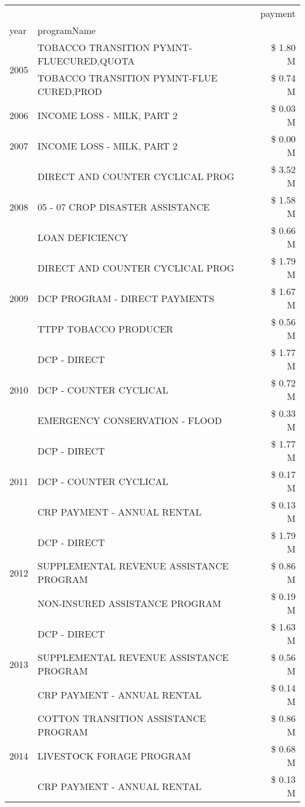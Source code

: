 \begin{tabular}{llr}
\toprule
 &  & payment \\
year & programName &  \\
\midrule
\multirow[t]{2}{*}{2005} & TOBACCO TRANSITION PYMNT-FLUECURED,QUOTA & \$ 1.80 M \\
 & TOBACCO TRANSITION PYMNT-FLUE CURED,PROD & \$ 0.74 M \\
\cline{1-3}
2006 & INCOME LOSS - MILK, PART 2 & \$ 0.03 M \\
\cline{1-3}
2007 & INCOME LOSS - MILK, PART 2 & \$ 0.00 M \\
\cline{1-3}
\multirow[t]{3}{*}{2008} & DIRECT AND COUNTER CYCLICAL PROG & \$ 3.52 M \\
 & 05 - 07 CROP DISASTER ASSISTANCE & \$ 1.58 M \\
 & LOAN DEFICIENCY & \$ 0.66 M \\
\cline{1-3}
\multirow[t]{3}{*}{2009} & DIRECT AND COUNTER CYCLICAL PROG & \$ 1.79 M \\
 & DCP PROGRAM - DIRECT PAYMENTS & \$ 1.67 M \\
 & TTPP TOBACCO PRODUCER & \$ 0.56 M \\
\cline{1-3}
\multirow[t]{3}{*}{2010} & DCP - DIRECT & \$ 1.77 M \\
 & DCP - COUNTER CYCLICAL & \$ 0.72 M \\
 & EMERGENCY CONSERVATION - FLOOD & \$ 0.33 M \\
\cline{1-3}
\multirow[t]{3}{*}{2011} & DCP - DIRECT & \$ 1.77 M \\
 & DCP - COUNTER CYCLICAL & \$ 0.17 M \\
 & CRP PAYMENT - ANNUAL RENTAL & \$ 0.13 M \\
\cline{1-3}
\multirow[t]{3}{*}{2012} & DCP - DIRECT & \$ 1.79 M \\
 & SUPPLEMENTAL REVENUE ASSISTANCE PROGRAM & \$ 0.86 M \\
 & NON-INSURED ASSISTANCE PROGRAM & \$ 0.19 M \\
\cline{1-3}
\multirow[t]{3}{*}{2013} & DCP - DIRECT & \$ 1.63 M \\
 & SUPPLEMENTAL REVENUE ASSISTANCE PROGRAM & \$ 0.56 M \\
 & CRP PAYMENT - ANNUAL RENTAL & \$ 0.14 M \\
\cline{1-3}
\multirow[t]{3}{*}{2014} & COTTON TRANSITION ASSISTANCE PROGRAM & \$ 0.86 M \\
 & LIVESTOCK FORAGE PROGRAM & \$ 0.68 M \\
 & CRP PAYMENT - ANNUAL RENTAL & \$ 0.13 M \\

\end{tabular}
